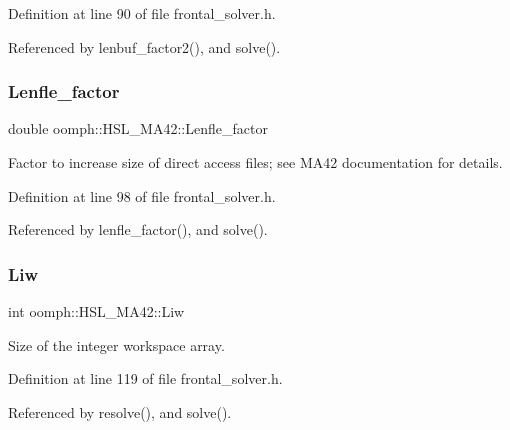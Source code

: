 Definition at line 90 of file frontal\+\_\+solver.\+h.



Referenced by lenbuf\+\_\+factor2(), and solve().

\mbox{\label{classoomph_1_1HSL__MA42_a2aace9e5575adf75ccef54b744831585}} 
\subsubsection{\texorpdfstring{Lenfle\+\_\+factor}{Lenfle\_factor}}
{\footnotesize\ttfamily double oomph\+::\+H\+S\+L\+\_\+\+M\+A42\+::\+Lenfle\+\_\+factor\hspace{0.3cm}{\ttfamily [private]}}



Factor to increase size of direct access files; see M\+A42 documentation for details. 



Definition at line 98 of file frontal\+\_\+solver.\+h.



Referenced by lenfle\+\_\+factor(), and solve().

\mbox{\label{classoomph_1_1HSL__MA42_a6ae8fb349617e5b1dfe64bb7a822de3c}} 
\subsubsection{\texorpdfstring{Liw}{Liw}}
{\footnotesize\ttfamily int oomph\+::\+H\+S\+L\+\_\+\+M\+A42\+::\+Liw\hspace{0.3cm}{\ttfamily [private]}}



Size of the integer workspace array. 



Definition at line 119 of file frontal\+\_\+solver.\+h.



Referenced by resolve(), and solve().

\mbox{\label{classoomph_1_1HSL__MA42_a0248d831f42eaf222c4283d17bdc2f5e}} 
